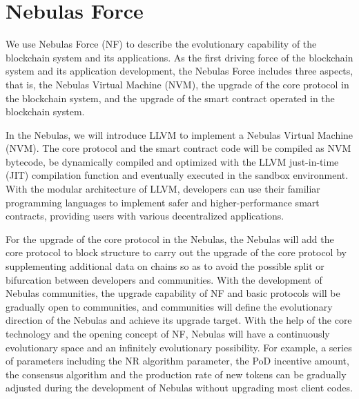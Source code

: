 \section{Nebulas Force}
\label{sec:nebulasforce}

We use Nebulas Force (NF) to describe the evolutionary capability of the blockchain system and its applications. As the first driving force of the blockchain system and its application development, the Nebulas Force includes three aspects, that is, the Nebulas Virtual Machine (NVM), the upgrade of the core protocol in the blockchain system, and the upgrade of the smart contract operated in the blockchain system.


In the Nebulas, we will introduce LLVM to implement a Nebulas Virtual Machine (NVM). The core protocol and the smart contract code will be compiled as NVM bytecode, be dynamically compiled and optimized with the LLVM just-in-time (JIT) compilation function and eventually executed in the sandbox environment. With the modular architecture of LLVM, developers can use their familiar programming languages to implement safer and higher-performance smart contracts, providing users with various decentralized applications. 


For the upgrade of the core protocol in the Nebulas, the Nebulas will add the core protocol to block structure to carry out the upgrade of the core protocol by supplementing additional data on chains so as to avoid the possible split or bifurcation between developers and communities. With the development of Nebulas communities, the upgrade capability of NF and basic protocols will be gradually open to communities, and communities will define the evolutionary direction of the Nebulas and achieve its upgrade target. With the help of the core technology and the opening concept of NF, Nebulas will have a continuously evolutionary space and an infinitely evolutionary possibility. For example, a series of parameters including the NR algorithm parameter, the PoD incentive amount, the consensus algorithm and the production rate of new tokens can be gradually adjusted during the development of Nebulas without upgrading most client codes.

